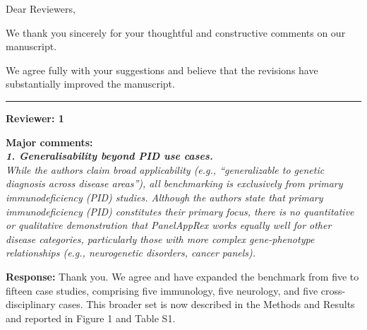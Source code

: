 \documentclass[12pt,a4paper]{letter}
\begin{document}
 
\raggedright
\begin{letter}{Dear Reviewers,}


\opening{}

We thank you sincerely for your thoughtful and constructive comments on our manuscript.

We agree fully with your suggestions and believe that the revisions have substantially improved the manuscript.

\noindent\rule{\textwidth}{0.4pt}

\textbf{Reviewer: 1}

\textbf{Major comments:}\\
\textit{\textbf{1. Generalisability beyond PID use cases.}\\
While the authors claim broad applicability (e.g., “generalizable to genetic diagnosis across disease areas”), all benchmarking is exclusively from primary immunodeficiency (PID) studies. Although the authors state that primary immunodeficiency (PID) constitutes their primary focus, there is no quantitative or qualitative demonstration that PanelAppRex works equally well for other disease categories, particularly those with more complex gene-phenotype relationships (e.g., neurogenetic disorders, cancer panels). }

%


\textbf{Response:} Thank you. We agree and have expanded the benchmark from five to fifteen case studies, comprising five immunology, five neurology, and five cross-disciplinary cases. This broader set is now described in the Methods and Results and reported in Figure 1 and Table S1.


\end{letter}
\end{document}
